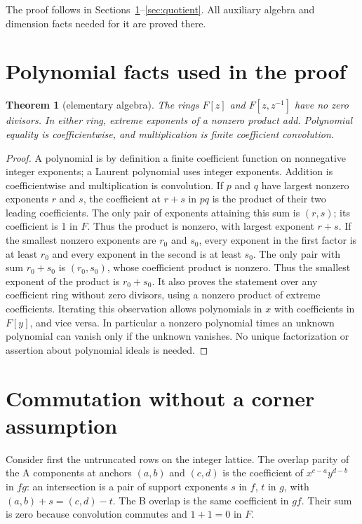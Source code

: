 \documentclass{article}
\newtheorem{theorem}{Theorem}
\begin{document}
The proof follows in Sections~\ref{sec:polynomial}--\ref{sec:quotient}. All
auxiliary algebra and dimension facts needed for it are proved there.

\section{Polynomial facts used in the proof}\label{sec:polynomial}

\begin{theorem}[elementary algebra]\label{thm:algebra}
  The rings \(F[z]\) and \(F[z, z^{-1}]\) have no zero divisors. In either
  ring, extreme exponents of a nonzero product add. Polynomial equality is
  coefficientwise, and multiplication is finite coefficient convolution.
\end{theorem}

\begin{proof}
  A polynomial is by definition a finite coefficient function on nonnegative
  integer exponents; a Laurent polynomial uses integer exponents. Addition is
  coefficientwise and multiplication is convolution. If \(p\) and \(q\) have
  largest nonzero exponents \(r\) and \(s\), the coefficient at \(r + s\) in
  \(pq\) is the product of their two leading coefficients. The only pair of
  exponents attaining this sum is \((r, s)\); its coefficient is 1 in \(F\).
  Thus the product is nonzero, with largest exponent \(r + s\). If the
  smallest nonzero exponents are \(r_0\) and \(s_0\), every exponent in the
  first factor is at least \(r_0\) and every exponent in the second is at
  least \(s_0\). The only pair with sum \(r_0 + s_0\) is \((r_0, s_0)\), whose
  coefficient product is nonzero. Thus the smallest exponent of the product is
  \(r_0 + s_0\). It also proves the statement over any coefficient ring
  without zero divisors, using a nonzero product of extreme coefficients.
  Iterating this observation allows polynomials in \(x\) with coefficients in
  \(F[y]\), and vice versa. In particular a nonzero polynomial times an
  unknown polynomial can vanish only if the unknown vanishes. No unique
  factorization or assertion about polynomial ideals is needed.
\end{proof}

\section{Commutation without a corner assumption}\label{sec:commutation}

Consider first the untruncated rows on the integer lattice. The overlap parity
of the A components at anchors \((a,b)\) and \((c,d)\) is the coefficient of
\(x^{c-a} y^{d-b}\) in \(fg\): an intersection is a pair of support exponents
\(s\) in \(f\), \(t\) in \(g\), with \((a,b) + s = (c,d) - t\). The B overlap
is the same coefficient in \(gf\). Their sum is zero because convolution
commutes and \(1 + 1 = 0\) in \(F\).
\end{document}
